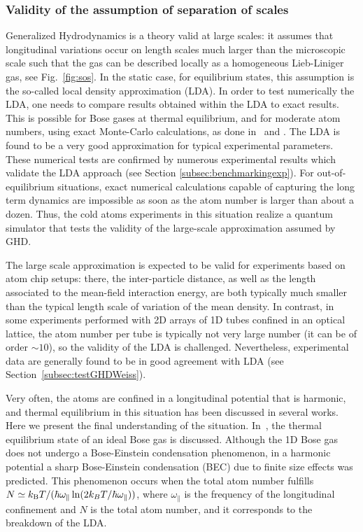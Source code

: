 \documentclass[onecolumn,amsfonts,showpacs,superscriptaddress]{revtex4-1}
\begin{document}
\subsubsection{Validity of the assumption of separation of scales}
\label{subsubsec:validityLDA}
Generalized Hydrodynamics is a theory valid at large scales: it assumes that longitudinal
variations occur on length scales much larger than the microscopic
scale such that the gas can be described locally as a homogeneous Lieb-Liniger gas, see Fig.~\ref{fig:sos}.
In the static case, for equilibrium states, this assumption is the so-called local density approximation (LDA). 
In order to test numerically the LDA, one needs to compare 
results obtained within the LDA to exact results. This is possible for Bose gases at thermal equilibrium, and for moderate atom numbers,  using exact Monte-Carlo calculations, as done in~\citep{jacqmin_momentum_2012} and \citep{yao_tans_2018}. 
The LDA is found to be a very good approximation
for typical experimental parameters.  These numerical tests are confirmed by numerous experimental results which validate the LDA approach (see Section \ref{subsec:benchmarkingexp}).
For out-of-equilibrium situations, 
exact numerical calculations capable of 
capturing the long term dynamics are 
impossible as soon as the atom number is larger than about a dozen. Thus, the cold atoms experiments in this situation realize a quantum simulator that tests the validity of the large-scale approximation assumed by GHD.


The large scale approximation is expected to be valid  
for experiments based on atom chip setups: there, the inter-particle distance, as well 
as the length associated to the mean-field interaction energy, are both typically 
much smaller than the typical length scale 
of variation of the mean density.
In contrast, in some experiments performed with 2D arrays of 
1D tubes confined in an optical lattice, the 
atom number per tube is typically not very large number (it can be of order $\sim 10$), so the validity of the LDA is challenged. Nevertheless, 
experimental data are generally found to be in good agreement with LDA (see Section~\ref{subsec:testGHDWeiss}).




Very often, the atoms are confined in a  longitudinal potential that is harmonic, and thermal equilibrium in this situation 
has been discussed in several works. Here we 
present the final understanding of the situation.
In~\citep{ketterle_bose-einstein_1996}, the thermal equilibrium state of an ideal Bose gas is discussed. Although the 1D Bose gas does not undergo a Bose-Einstein condensation phenomenon, in a harmonic potential a sharp Bose-Einstein
condensation (BEC) due to
finite size effects was predicted. This phenomenon occurs
when the total atom number fulfills
$N \simeq k_{\rm B} T /(\hbar \omega_\parallel \ln(2k_BT/\hbar\omega_\parallel))$, where $\omega_\parallel$ is the frequency of the longitudinal confinement and $N$ is the total atom number, and it corresponds to the breakdown of the LDA.
\end{document}
